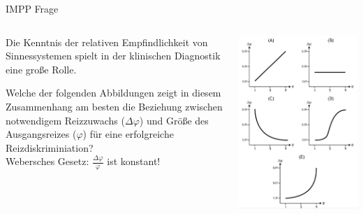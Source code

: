 \documentclass[aspectratio=169]{beamer}
\begin{document}
\begin{frame}{IMPP Frage}


\begin{columns}[c]
\begin{column}{6cm}
Die Kenntnis der relativen Empfindlichkeit von Sinnessystemen spielt in der klinischen Diagnostik eine große Rolle. 

Welche der folgenden Abbildungen zeigt in diesem Zusammenhang am besten die Beziehung zwischen \textcolor{theme}{notwendigem Reizzuwachs} (\( \Delta \varphi \)) und \textcolor{theme}{Größe des Ausgangsreizes} (\(\varphi\)) für eine erfolgreiche Reizdiskriminiation? \\[0.2 cm]


\textcolor{theme}{Webersches Gesetz: \(\frac{\Delta \varphi}{\varphi}\) ist konstant!}


\end{column}


\begin{column}{5cm}
\begin{center}
    \includegraphics[width=\textwidth]{weber_IMPP.png}
\end{center}
\end{column}

\end{columns}
    
\end{frame}
\end{document}

